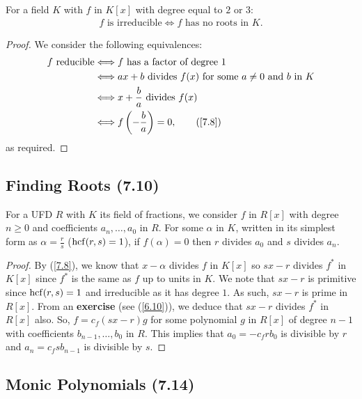 For a field $K$ with $f$ in $K[x]$ with degree equal to $2$ or $3$: \begin{align*}
    f \text{ is irreducible} \Longleftrightarrow f \text{ has no roots in } K.
\end{align*}

\begin{proof}
    We consider the following equivalences: \begin{align*}
        f \text{ reducible}
        &\Longleftrightarrow f \text{ has a factor of degree } 1 \\
        &\Longleftrightarrow ax + b \text{ divides $f(x)$ for some $a \neq 0$ and $b$ in $K$} \\
        &\Longleftrightarrow x + \frac{b}{a} \text{ divides } f(x) \\
        &\Longleftrightarrow f\left(-\frac{b}{a}\right) = 0, \tag{\ref{7.8}}
    \end{align*} as required.
\end{proof}

\subsection{Finding Roots (7.10)} \label{7.10}

For a UFD $R$ with $K$ its field of fractions, we consider $f$ in $R[x]$ with
degree $n \geq 0$ and coefficients $a_n, \ldots, a_0$ in $R$. For some $\alpha$
in $K$, written in its simplest form as $\alpha = \frac{r}{s}$ ($\operatorname{hcf}(r, s) = 1$),
if $f(\alpha) = 0$ then $r$ divides $a_0$ and $s$ divides $a_n$.

\begin{proof}
    By (\ref{7.8}), we know that $x - \alpha$ divides $f$ in $K[x]$ so $sx - r$ divides
    $f^\ast$ in $K[x]$ since $f^\ast$ is the same as $f$ up to units in $K$. We note that
    $sx - r$ is primitive since $\operatorname{hcf}(r, s) = 1$ and irreducible as it has degree $1$.
    As such, $sx - r$ is prime in $R[x]$. From an \textbf{exercise} (see (\ref{6.10})), 
    we deduce that $sx - r$ divides $f^\ast$ in $R[x]$ also.
    \bs
    So, $f = c_f(sx-r)g$ for some polynomial $g$ in $R[x]$ of degree $n - 1$ with coefficients
    $b_{n - 1}, \ldots, b_0$ in $R$. This implies that $a_0 = -c_frb_0$ is divisible by $r$
    and $a_n = c_fsb_{n - 1}$ is divisible by $s$.
\end{proof}

\subsection{Monic Polynomials (7.14)} \label{7.14}

